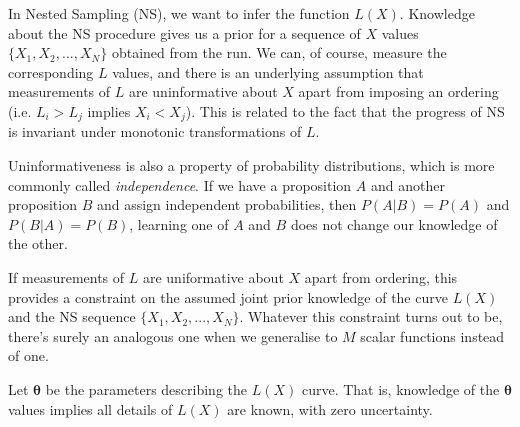 \documentclass[a4paper, 11pt]{article}
\title{}
\author{}
\begin{document}
\maketitle

In Nested Sampling (NS), we want to infer the function $L(X)$.
Knowledge about the NS procedure gives us a prior for a sequence of $X$ values
$\{X_1, X_2, ..., X_N\}$
obtained from the run. We can, of course, measure the corresponding $L$
values, and there is an underlying assumption that measurements of $L$ are
uninformative about $X$ apart from imposing an ordering
(i.e. $L_i > L_j$ implies $X_i < X_j$). This is related to the fact that the
progress of NS is invariant under monotonic transformations of $L$.

Uninformativeness is also a property of probability distributions, which
is more commonly called {\it independence}. If we have a proposition $A$ and
another proposition $B$ and assign independent probabilities, then
$P(A|B) = P(A)$ and $P(B|A) = P(B)$, learning one of $A$ and $B$
does not change our knowledge of the other.

If measurements of $L$ are uniformative about $X$ apart from ordering, this
provides a constraint on the assumed joint prior knowledge of the curve
$L(X)$ and the NS sequence $\{X_1, X_2, ..., X_N\}$. Whatever this constraint
turns out to be, there's surely an analogous one when we generalise to
$M$ scalar functions instead of one.

Let $\boldsymbol{\theta}$ be the parameters describing the $L(X)$ curve. That
is, knowledge of the $\boldsymbol{\theta}$ values implies all details of
$L(X)$ are known, with zero uncertainty.
\end{document}
